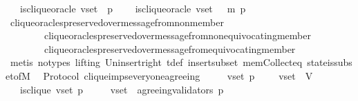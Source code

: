 \begin{isabellebody}
\ \ {\isasymlongrightarrow}\ is{\isacharunderscore}clique{\isacharunderscore}oracle\ {\isacharparenleft}v{\isacharunderscore}set{\isacharcomma}\ {\isasymsigma}{\isacharcomma}\ p{\isacharparenright}\ \isanewline
\ \ {\isasymlongrightarrow}\ is{\isacharunderscore}clique{\isacharunderscore}oracle\ {\isacharparenleft}v{\isacharunderscore}set{\isacharcomma}\ {\isasymsigma}\ {\isasymunion}\ {\isacharbraceleft}m{\isacharbraceright}{\isacharcomma}\ p{\isacharparenright}{\isachardoublequoteclose}\isanewline
%
\isadelimproof
\ \ %
\endisadelimproof
%
\isatagproof
{}\isamarkupfalse%
\ clique{\isacharunderscore}oracles{\isacharunderscore}preserved{\isacharunderscore}over{\isacharunderscore}message{\isacharunderscore}from{\isacharunderscore}non{\isacharunderscore}member\isanewline
\ \ \ \ \ \ \ \ clique{\isacharunderscore}oracles{\isacharunderscore}preserved{\isacharunderscore}over{\isacharunderscore}message{\isacharunderscore}from{\isacharunderscore}non{\isacharunderscore}equivocating{\isacharunderscore}member\isanewline
\ \ \ \ \ \ \ \ clique{\isacharunderscore}oracles{\isacharunderscore}preserved{\isacharunderscore}over{\isacharunderscore}message{\isacharunderscore}from{\isacharunderscore}equivocating{\isacharunderscore}member\isanewline
\ \ \isamarkupfalse%
\ {\isacharparenleft}metis\ {\isacharparenleft}no{\isacharunderscore}types{\isacharcomma}\ lifting{\isacharparenright}\ Un{\isacharunderscore}insert{\isacharunderscore}right\ {\isasymSigma}t{\isacharunderscore}def\ insert{\isacharunderscore}subset\ mem{\isacharunderscore}Collect{\isacharunderscore}eq\ state{\isacharunderscore}is{\isacharunderscore}subset{\isacharunderscore}of{\isacharunderscore}M{\isacharparenright}%
\endisatagproof
{\isafoldproof}%
%
\isadelimproof
\isanewline
%
\endisadelimproof
\isanewline
\isanewline
\isanewline
{}\isamarkupfalse%
\ {\isacharparenleft}\ Protocol{\isacharparenright}\ clique{\isacharunderscore}imps{\isacharunderscore}everyone{\isacharunderscore}agreeing\ {\isacharcolon}\isanewline
\ \ {\isachardoublequoteopen}{\isasymforall}\ {\isasymsigma}\ v{\isacharunderscore}set\ p{\isachardot}\ {\isasymsigma}\ {\isasymin}\ {\isasymSigma}\ {\isasymand}\ v{\isacharunderscore}set\ {\isasymsubseteq}\ V\ \isanewline
\ \ {\isasymlongrightarrow}\ is{\isacharunderscore}clique\ {\isacharparenleft}v{\isacharunderscore}set{\isacharcomma}\ p{\isacharcomma}\ {\isasymsigma}{\isacharparenright}\ \isanewline
\ \ {\isasymlongrightarrow}\ v{\isacharunderscore}set\ {\isasymsubseteq}\ agreeing{\isacharunderscore}validators\ {\isacharparenleft}p{\isacharcomma}\ {\isasymsigma}{\isacharparenright}{\isachardoublequoteclose}\isanewline

\end{isabellebody}
